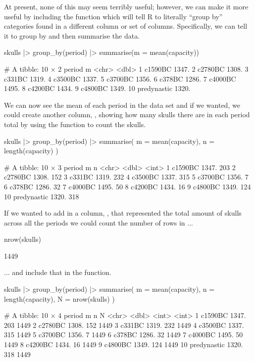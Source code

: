 At present, none of this may seem terribly useful; however, we can make it more useful by including the  function which will tell R to literally ``group by'' categories found in a different column or set of columns. Specifically, we can tell it to group by  and then summarise the data.

\begin{inR}
skulls |> 
  group_by(period) |> 
  summarise(m = mean(capacity))
\end{inR}
\begin{outR}
# A tibble: 10 × 2
   period          m
   <chr>       <dbl>
 1 c1590BC     1347.
 2 c2780BC     1308.
 3 c331BC      1319.
 4 c3500BC     1337.
 5 c3700BC     1356.
 6 c378BC      1286.
 7 c4000BC     1495.
 8 c4200BC     1434.
 9 c4800BC     1349.
10 predynastic 1320.
\end{outR}

We can now see the mean of each period in the data set and if we wanted, we could create another column, , showing how many skulls there are in each period total by using the  function to count the skulls.

\begin{inR}
skulls |>
  group_by(period) |>
  summarise(
    m = mean(capacity),
    n = length(capacity)
  )
\end{inR}
\begin{outR}
# A tibble: 10 × 3
   period          m     n
   <chr>       <dbl> <int>
 1 c1590BC     1347.   203
 2 c2780BC     1308.   152
 3 c331BC      1319.   232
 4 c3500BC     1337.   315
 5 c3700BC     1356.     7
 6 c378BC      1286.    32
 7 c4000BC     1495.    50
 8 c4200BC     1434.    16
 9 c4800BC     1349.   124
10 predynastic 1320.   318
\end{outR}

If we wanted to add in a column, , that represented the total amount of skulls across all the periods we could count the number of rows in ...

\begin{inR}
nrow(skulls)
\end{inR}
\begin{outR}
[1] 1449
\end{outR}

\noindent
... and include that in the  function.

\begin{inR}
skulls |>
  group_by(period) |>
  summarise(
    m = mean(capacity),
    n = length(capacity),
    N = nrow(skulls)
  )
\end{inR}
\begin{outR}
# A tibble: 10 × 4
   period          m     n     N
   <chr>       <dbl> <int> <int>
 1 c1590BC     1347.   203  1449
 2 c2780BC     1308.   152  1449
 3 c331BC      1319.   232  1449
 4 c3500BC     1337.   315  1449
 5 c3700BC     1356.     7  1449
 6 c378BC      1286.    32  1449
 7 c4000BC     1495.    50  1449
 8 c4200BC     1434.    16  1449
 9 c4800BC     1349.   124  1449
10 predynastic 1320.   318  1449
\end{outR}

